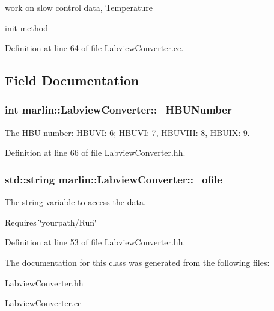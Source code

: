 work on slow control data, Temperature 

init method 

Definition at line 64 of file Labview\-Converter.\-cc.



\subsection{Field Documentation}
\subsubsection[{\-\_\-\-H\-B\-U\-Number}]{\setlength{\rightskip}{0pt plus 5cm}int marlin\-::\-Labview\-Converter\-::\-\_\-\-H\-B\-U\-Number\hspace{0.3cm}{\ttfamily [protected]}}\label{classmarlin_1_1LabviewConverter_af4d39fa4509ab8f4c3a8e074ab6a5140}


The H\-B\-U number\-: H\-B\-U\-V\-I\-: 6; H\-B\-U\-V\-I\-: 7, H\-B\-U\-V\-I\-I\-I\-: 8, H\-B\-U\-I\-X\-: 9. 



Definition at line 66 of file Labview\-Converter.\-hh.

\subsubsection[{\-\_\-ofile}]{\setlength{\rightskip}{0pt plus 5cm}std\-::string marlin\-::\-Labview\-Converter\-::\-\_\-ofile\hspace{0.3cm}{\ttfamily [protected]}}\label{classmarlin_1_1LabviewConverter_aae187f85848e953e0a1bb84763c9d817}


The string variable to access the data. 

Requires \char`\"{}yourpath/\-Run\char`\"{} 

Definition at line 53 of file Labview\-Converter.\-hh.



The documentation for this class was generated from the following files\-:\begin{DoxyCompactItemize}
\item 
Labview\-Converter.\-hh\item 
Labview\-Converter.\-cc\end{DoxyCompactItemize}
